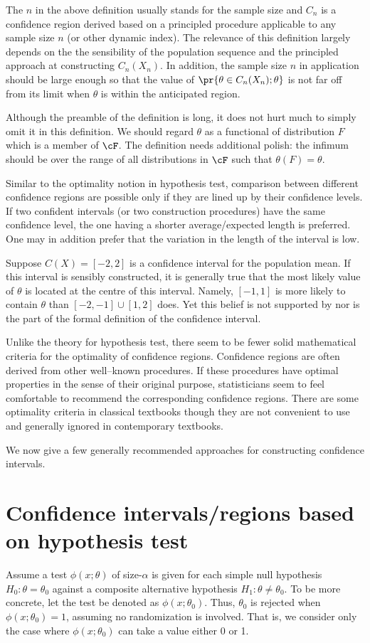 The $n$ in the above definition usually stands for the sample size 
and $C_n$ is a confidence region derived based on a principled procedure 
applicable to any sample size $n$ (or other dynamic index).
The relevance of this definition largely depends on the
the sensibility of the population sequence and the
principled approach at constructing $C_n(X_n)$. In addition,
the sample size $n$ in application should be large enough
so that the value of $\pr\{\theta \in C_n(X_n); \theta \}$
is not far off from its limit when $\theta$ is within  the anticipated region.

Although the preamble of the definition is long, it does not hurt
much to simply omit it in this definition. We should regard $\theta$
as a functional of distribution $F$ which is a member of $\cF$.
The definition needs additional polish:
the infimum should be over the range of all distributions in $\cF$
such that $\theta(F) = \theta$.

Similar to the optimality notion in hypothesis test, comparison
between different confidence regions are possible only if they
are lined up by their confidence levels.
If two confident intervals (or two construction procedures)
have the same confidence level, the one having
a shorter average/expected length is preferred. 
One may in addition prefer that
the variation in the length of the interval is low.

Suppose $C(X)= [-2, 2]$ is a confidence interval for the population mean.
If this interval is sensibly constructed,
it is generally true that the most likely value of $\theta$ is located
at the centre of this interval.  Namely, $[-1, 1]$ is more likely
to contain $\theta$ than $[-2, -1]\cup [1, 2]$ does.
Yet this belief is not supported by nor is the part of the formal
definition of the confidence interval. 

Unlike the theory for hypothesis test, there seem to be fewer
solid mathematical criteria for the optimality of confidence
regions. Confidence regions are often derived from other
well--known procedures. If these procedures have optimal
properties in the sense of their original purpose, statisticians seem to feel comfortable
to recommend the corresponding confidence regions. 
There are some optimality criteria  in classical textbooks
though they are not convenient to use and generally ignored
in contemporary textbooks.

We now give a few generally recommended approaches
for constructing confidence intervals. 

\section{Confidence intervals/regions based on hypothesis test}
Assume a test $\phi(x; \theta)$ of size-$\alpha$ is
given for each simple null hypothesis $H_0: \theta = \theta_0$
against a composite alternative hypothesis $H_1: \theta \neq \theta_0$.
To be more concrete, let the test be denoted as $\phi(x; \theta_0)$. 
Thus, $\theta_0$ is rejected when $\phi(x; \theta_0) = 1$, assuming no randomization
is involved.
That is, we consider only the case where $\phi(x; \theta_0)$ can take a value either 0 or 1.


